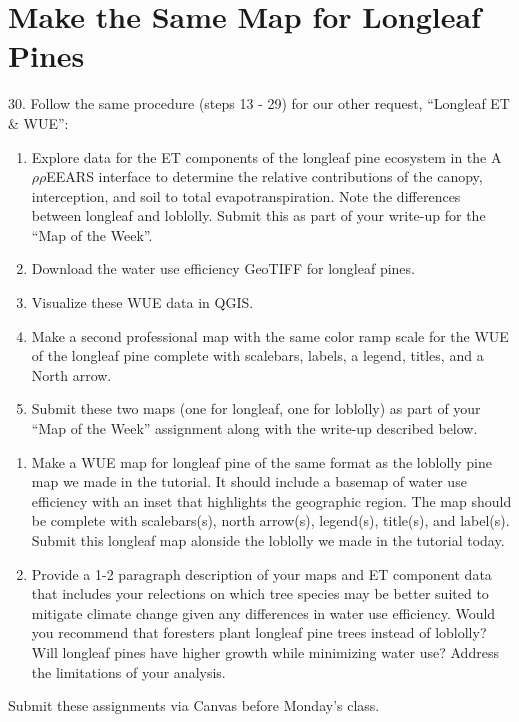 \documentclass[oneside,a4paper,11pt,explicit]{book}
\begin{document}
\section{Make the Same Map for Longleaf Pines}

30. Follow the same procedure (steps 13 - 29) for our other request, ``Longleaf ET \& WUE'':

\begin{enumerate}
	\item Explore data for the ET components of the longleaf pine ecosystem in the A$\rho\rho$EEARS interface to determine the relative contributions of the canopy, interception, and soil to total evapotranspiration. Note the differences between longleaf and loblolly. Submit this as part of your write-up for the ``Map of the Week''.
	\item Download the water use efficiency GeoTIFF for longleaf pines.
	\item Visualize these WUE data in QGIS.
	\item Make a second professional map with the same color ramp scale for the WUE of the longleaf pine complete with scalebars, labels, a legend, titles, and a North arrow.
	\item Submit these two maps (one for longleaf, one for loblolly) as part of your ``Map of the Week'' assignment along with the write-up described below.
\end{enumerate}

\begin{tcolorbox}[colback=yellow!5!white,colframe=IceCreamOrbit,title= \vspace{.2em} \Large Map of the Week Assignments]
	\large
	\begin{enumerate}
		\item Make a WUE map for longleaf pine of the same format as the loblolly pine map we made in the tutorial. It should include a basemap of water use efficiency with an inset that highlights the geographic region. The map should be complete with scalebars(s), north arrow(s), legend(s), title(s), and label(s). Submit this longleaf map alonside the loblolly we made in the tutorial today.
        \item Provide a 1-2 paragraph description of your maps and ET component data that includes your relections on which tree species may be better suited to mitigate climate change given any differences in water use efficiency. Would you recommend that foresters plant longleaf pine trees instead of loblolly? Will longleaf pines have higher growth while minimizing water use? Address the limitations of your analysis.
	\end{enumerate}
	Submit these assignments via Canvas before Monday's class.
\end{tcolorbox}
\end{document}

